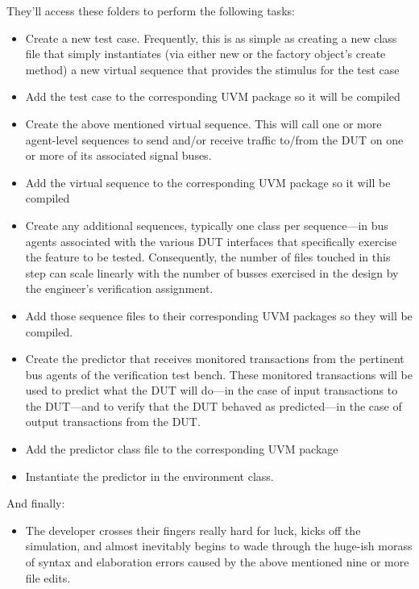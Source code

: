 \documentclass[twocolumn,letterpaper]{IEEEAerospaceCLS}  %
\begin{document}
They'll access these folders to perform the following tasks:
\begin{itemize}
    \item Create a new test case. Frequently, this is as simple as creating a new class file that simply instantiates (via either new or the factory object's create method) a new virtual sequence that provides the stimulus for the test case
    \item Add the test case to the corresponding UVM package so it will be compiled
    \item Create the above mentioned virtual sequence. This will call one or more agent-level sequences to send and/or receive traffic to/from the DUT on one or more of its associated signal buses.
    \item Add the virtual sequence to the corresponding UVM package so it will be compiled
    \item Create any additional sequences, typically one class per sequence—in bus agents associated with the various DUT interfaces that specifically exercise the feature to be tested. Consequently, the number of files touched in this step can scale linearly with the number of busses exercised in the design by the engineer's verification assignment.
    \item Add those sequence files to their corresponding UVM packages so they will be compiled.
    \item Create the predictor that receives monitored transactions from the pertinent bus agents of the verification test bench. These monitored transactions will be used to predict what the DUT will do—in the case of input transactions to the DUT—and to verify that the DUT behaved as predicted—in the case of output transactions from the DUT.
    \item Add the predictor class file to the corresponding UVM package

    \item Instantiate the predictor in the environment class.
\end{itemize}
And finally:

\begin{itemize}
    \item The developer crosses their fingers really hard for luck, kicks off the simulation, and almost inevitably begins to wade through the huge-ish morass of syntax and elaboration errors caused by the above mentioned nine or more file edits.
\end{itemize}
\end{document}
